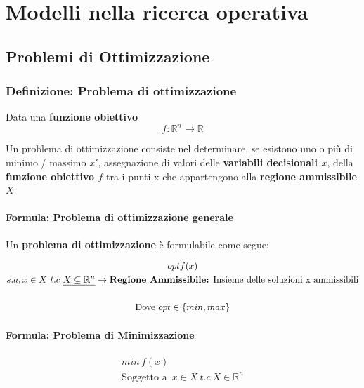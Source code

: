 \chapter{Modelli nella ricerca operativa}

    \section{Problemi di Ottimizzazione}

        \subsection{Definizione: Problema di ottimizzazione}
        Data una \textbf{funzione obiettivo}
        {
            \Large
            $$
                f:\mathbb{R}^n \to \mathbb{R}
            $$
        }

        Un problema di ottimizzazione consiste nel determinare, se esistono uno o più di minimo / massimo $x'$, assegnazione di valori delle \textbf{variabili decisionali $x$}, della \textbf{funzione obiettivo $f$} tra i punti x che appartengono alla \textbf{regione ammissibile $X$}


        \subsubsection{Formula: Problema di ottimizzazione generale}
        Un \textbf{problema di ottimizzazione} è formulabile come segue:
        {
            \large

            \begin{gather*}
                optf(x) \\
                s.a, x\in X \ t.c \  \uline{X \subseteq \mathbb{R}^n} \to \text{\textbf{Regione Ammissibile:} Insieme delle soluzioni x ammissibili} \\ \\
                \text{Dove } opt \in \{min, max\}
            \end{gather*}
        }


        \subsubsection{Formula: Problema di Minimizzazione}
        \begin{gather*}
            min\, f(x) \\
            \text{Soggetto a } \, x \in X  \ t.c \ X \in \mathbb{R}^n
        \end{gather*}

